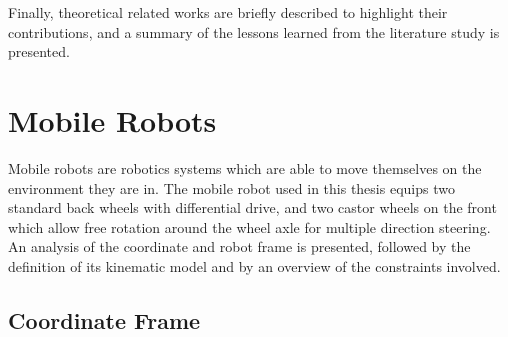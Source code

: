 Finally, theoretical related works are briefly described to highlight their contributions, and a summary of the lessons learned from the literature study is presented.


\section{Mobile Robots}

\noindent Mobile robots are robotics systems which are able to move themselves on the environment they are in.
The mobile robot used in this thesis equips two standard back wheels with differential drive, and two castor wheels on the front which allow free rotation around the wheel axle for multiple direction steering.
An analysis of the coordinate and robot frame is presented, followed by the definition of its kinematic model and by an overview of the constraints involved.

\subsection{Coordinate Frame}

